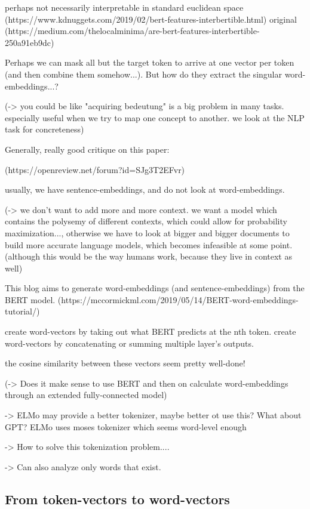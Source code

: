 \documentclass[a4paper,12pt,twoside,openright]{report}
\begin{document}
perhaps not necessarily interpretable in standard euclidean space
(https://www.kdnuggets.com/2019/02/bert-features-interbertible.html)
original (https://medium.com/thelocalminima/are-bert-features-interbertible-250a91eb9dc)

Perhaps we can mask all but the target token to arrive at one vector per token (and then combine them somehow...).
But how do they extract the singular word-embeddings...?

(-> you could be like "acquiring bedeutung" is a big problem in many tasks. especially useful when we try to map one concept to another. we look at the NLP task for concreteness)

Generally, really good critique on this paper:

(https://openreview.net/forum?id=SJg3T2EFvr)

usually, we have sentence-embeddings, and do not look at word-embeddings.

(-> we don't want to add more and more context. we want a model which contains the polysemy of different contexts, which could allow for probability maximization..., otherwise we have to look at bigger and bigger documents to build more accurate language models, which becomes infeasible at some point. (although this would be the way humans work, because they live in context as well)

This blog aims to generate word-embeddings (and sentence-embeddings) from the BERT model.
(https://mccormickml.com/2019/05/14/BERT-word-embeddings-tutorial/)

create word-vectors by taking out what BERT predicts at the nth token.
create word-vectors by concatenating or summing multiple layer's outputs.

the cosine similarity between these vectors seem pretty well-done!


(-> Does it make sense to use BERT and then on calculate word-embeddings through an extended fully-connected model)

-> ELMo may provide a better tokenizer, maybe better ot use this? What about GPT? ELMo uses moses tokenizer which seems word-level enough

-> How to solve this tokenization problem....

-> Can also analyze only words that exist.

\subsection{From token-vectors to word-vectors}
\end{document}
